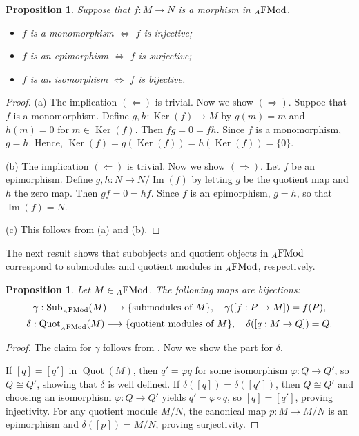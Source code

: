 \documentclass[12pt]{amsart}
\newtheorem{prop}[thm]{Proposition}
\theoremstyle{definition}
\newcommand{\FMod}{{\rm FMod}}
\DeclareMathOperator{\Sub}{Sub}
\DeclareMathOperator{\Quot}{Quot}
\DeclareMathOperator{\Ker}{Ker}
\DeclareMathOperator{\Ima}{Im}
\begin{document}
\begin{prop}\label{prop:monoisinj}
Suppose that $f : M \to N$ is a morphism 
in ${}_A \FMod$.

\begin{itemize}[widest=(a)]

\item[{\rm (a)}] $f$ is a monomorphism
$\Longleftrightarrow$ $f$ is injective;

\item[{\rm (b)}] $f$ is an epimorphism
$\Longleftrightarrow$ $f$ is surjective;

\item[{\rm (c)}] $f$ is an isomorphism
$\Longleftrightarrow$ $f$ is bijective.

\end{itemize}
\end{prop}

\begin{proof}
(a) The implication $(\Leftarrow)$ is trivial.
Now we show $(\Rightarrow)$. 
Suppoe that $f$ is a monomorphism. 
Define $g,h : \Ker(f) \to M$ by 
$g(m)=m$ and $h(m)=0$ for $m \in \Ker(f)$.
Then $f g = 0 = fh$. 
Since $f$ is a monomorphism, $g=h$. Hence,
$\Ker(f) = g( \Ker(f) ) = h( \Ker(f) ) = \{ 0 \}$.

(b) The implication $(\Leftarrow)$ is trivial.
Now we show $(\Rightarrow)$. 
Let $f$ be
an epimorphism. Define $g,h : N \to N/\Ima(f)$
by letting $g$ be the quotient map and $h$
the zero map. Then $gf = 0 = hf$. Since $f$ is 
an epimorphism, $g = h$, so that 
$\Ima(f)=N$. 

(c) This follows from (a) and (b).
\end{proof}

The next result shows that subobjects and 
quotient objects
in ${}_A\FMod$ correspond 
to submodules
and quotient modules in ${}_A\FMod$,
respectively.

\begin{prop}\label{prop:bijections}
Let $M \in  {}_A \FMod$. The following maps
are bijections:
\[
\begin{array}{c}
\gamma : \Sub_{{}_A\FMod}(M) \longrightarrow 
\{ \text{submodules of } M \},
\quad 
\gamma([f:P \to M]) = f(P), \\[5pt]
\delta : \Quot_{ {}_A\FMod }(M) \longrightarrow 
\{ \text{quotient modules of } M \},
\quad 
\delta([q:M \to Q]) = Q.
\end{array}
\]
\end{prop}

\begin{proof}
The claim for $\gamma$ follows from 
\cite[Thm. 4.2]{valjako2020}.
Now we show the part for $\delta$.

If $[q]=[q']$ in $\Quot(M)$, then $q'=\varphi q$ 
for some isomorphism $\varphi : Q \to Q'$, so 
$Q\cong Q'$, showing that $\delta$ is well defined. 
If $\delta([q])=\delta([q'])$, then $Q \cong Q'$ 
and choosing an isomorphism $\varphi:Q\to Q'$ yields $q'=\varphi\circ q$, so $[q]=[q']$, proving injectivity. For any quotient module $M/N$, the canonical map 
$p:M\to M/N$ is an epimorphism and $\delta([p])=M/N$,
proving surjectivity.
\end{proof}
\end{document}
